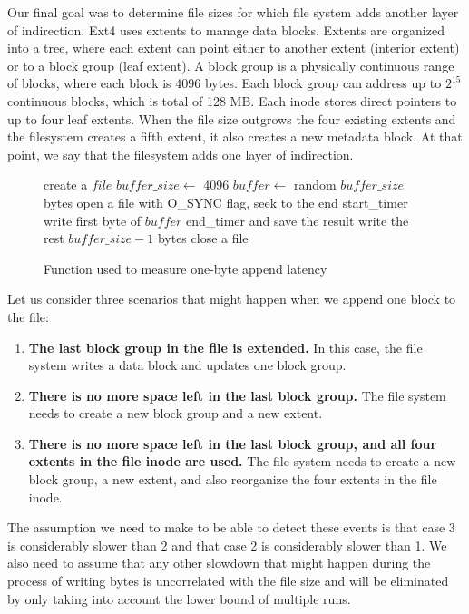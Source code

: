 Our final goal was to determine file sizes for which file system adds another layer of indirection. Ext4 uses extents to manage data blocks. \cite{ext4extents} Extents are organized into a tree, where each extent can point either to another extent (interior extent) or to a block group (leaf extent). A block group is a physically continuous range of blocks, where each block is 4096 bytes. Each block group can address up to $2^{15}$ continuous blocks, which is total of 128 MB. Each inode stores direct pointers to up to four leaf extents. When the file size outgrows the four existing extents and the filesystem creates a fifth extent, it also creates a new metadata block. At that point, we say that the filesystem adds one layer of indirection.

\begin{figure}[t!]
\begin{algorithmic}
\STATE create a $file$
\STATE $buffer\_size \leftarrow$ 4096
\STATE $buffer \leftarrow$ random $buffer\_size$ bytes
\STATE open a file with O\_SYNC flag, seek to the end
\STATE start\_timer
\STATE write first byte of $buffer$
\STATE end\_timer and save the result
\STATE write the rest $buffer\_size - 1$ bytes
\STATE close a file
\ENDFOR
\end{algorithmic}
\caption{Function used to measure one-byte append latency}
\label{fig:p4pseudo}
\end{figure}



Let us consider three scenarios that might happen when we append one block to the file:
\begin{enumerate}
\item \textbf{The last block group in the file is extended.} In this case, the file system writes a data block and updates one block group.
\item \textbf{There is no more space left in the last block group.} The file system needs to create a new block group and a new extent.
\item \textbf{There is no more space left in the last block group, and all four extents in the file inode are used.} The file system needs to create a new block group, a new extent, and also reorganize the four extents in the file inode.
\end{enumerate}

The assumption we need to make to be able to detect these events is that case 3 is considerably slower than 2 and that case 2 is considerably slower than 1. We also need to assume that any other slowdown that might happen during the process of writing bytes is uncorrelated with the file size and will be eliminated by only taking into account the lower bound of multiple runs.

